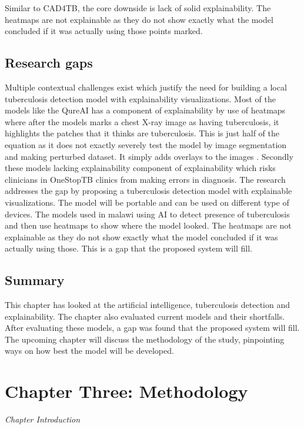 \documentclass[12pt,a4paper]{article}
\begin{document}
Similar to CAD4TB, the core downside is lack of solid explainability. The heatmaps are not explainable as they do not show exactly what the model concluded if it was actually using those points marked. 

\subsection{Research gaps}

Multiple contextual challenges exist which justify the need for building a local tuberculosis detection model with explainability visualizations. Most of the models like the QureAI has a component of explainability by use of heatmaps where after the models marks a chest X-ray image as having tuberculosis, it highlights the patches that it thinks are tuberculosis. This is just half of the equation as it does not exactly severely test the model by image segmentation and making perturbed dataset. It simply adds overlays to the images \citep{Suthers2025}. Secondly these models lacking explainability component of explainability which risks clinicians in OneStopTB clinics from making errors in diagnosis. The research addresses the gap by proposing a tuberculosis detection model with explainable visualizations. The model will be portable and can be used on different type of devices. 
The models used in malawi using AI to detect presence of tuberculosis and then use heatmaps to show where the model looked. The heatmaps are not explainable as they do not show exactly what the model concluded if it was actually using those. This is a gap that the proposed system will fill.


\subsection{Summary}
This chapter has looked at the artificial intelligence, tuberculosis detection and explainability. The chapter also evaluated current models and their shortfalls. After evaluating these models, a gap was found that the proposed system will fill. The upcoming chapter will discuss the methodology of the study, pinpointing ways on how best the model will be developed.

\newpage

\section{Chapter Three: Methodology}
\textit{Chapter Introduction}
\end{document}
